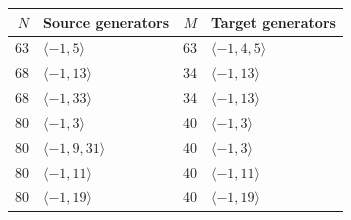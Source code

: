 \begin{tabular}{rlrl}
\toprule $N$ & Source generators & $M$ & Target generators \\
\midrule
63 & $\langle -1, 5\rangle$ & 63 & $\langle -1, 4, 5\rangle$ \\
68 & $\langle -1, 13\rangle$ & 34 & $\langle -1, 13\rangle$ \\
68 & $\langle -1, 33\rangle$ & 34 & $\langle -1, 13\rangle$ \\
80 & $\langle -1, 3\rangle$ & 40 & $\langle -1, 3\rangle$ \\
80 & $\langle -1, 9, 31\rangle$ & 40 & $\langle -1, 3\rangle$ \\
80 & $\langle -1, 11\rangle$ & 40 & $\langle -1, 11\rangle$ \\
80 & $\langle -1, 19\rangle$ & 40 & $\langle -1, 19\rangle$ \\
\bottomrule
\end{tabular}

